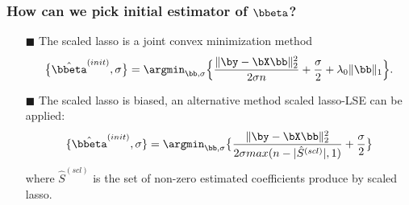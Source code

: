 \begin{frame}
\frametitle{How can we pick initial estimator of $\bbeta$?}
\begin{itemize}
\item[$\blacksquare$] The scaled lasso is a joint convex minimization method
\begin{equation}
\big\{\hat{\bbeta}^{(init)},\sigma\big\} = \argmin_{\bb,\sigma}
\Big\{\frac{\|\by-\bX\bb\|_2^2}{2\sigma n} + \frac{\sigma}{2}+\lambda_0\|\bb\|_1\Big\}.
\end{equation}
\item[$\blacksquare$] The scaled lasso is biased, an alternative method scaled lasso-LSE can be applied:
\begin{equation}
\{\hat{\bbeta}^{(init)},\sigma\} = \argmin_{\bb,\sigma}
\big\{\frac{\|\by-\bX\bb\|_2^2}{2\sigma max(n-|\hat{S}^{(scl)}|,1)} + \frac{\sigma}{2}\big\}
\end{equation}
where $\hat{S}^{(scl)}$ is the set of non-zero estimated coefficients produce by scaled lasso.
\end{itemize}
\end{frame}




